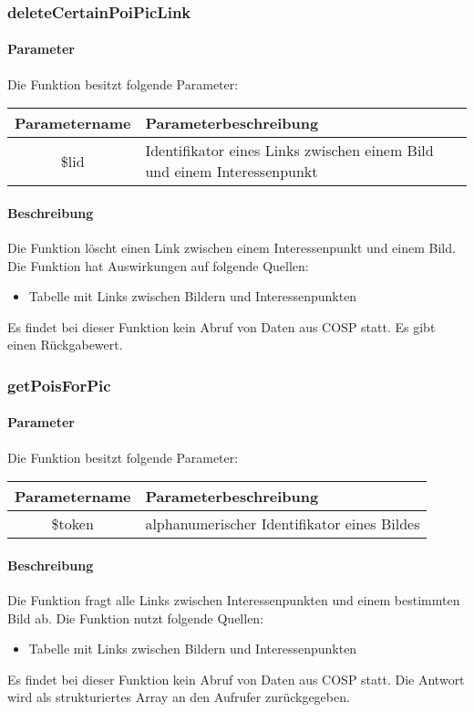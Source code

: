 \subsubsection{deleteCertainPoiPicLink}
\paragraph{Parameter} Die Funktion besitzt folgende Parameter:
\begin{table}[H]
	\begin{tabular}{|c|p{11cm}|}
		\hline
		\textbf{Parametername} & \textbf{Parameterbeschreibung} \\ \hline
		\$lid & Identifikator eines Links zwischen einem Bild und einem Interessenpunkt \\ \hline
	\end{tabular}
\end{table}
\paragraph{Beschreibung} Die Funktion löscht einen Link zwischen einem Interessenpunkt und einem Bild. Die Funktion hat Auswirkungen auf folgende Quellen:
\begin{itemize}
	\item Tabelle mit Links zwischen Bildern und Interessenpunkten
\end{itemize}
Es findet bei dieser Funktion kein Abruf von Daten aus {\glqq COSP\grqq} statt. Es gibt einen Rückgabewert.
\subsubsection{getPoisForPic}
\paragraph{Parameter} Die Funktion besitzt folgende Parameter:
\begin{table}[H]
	\begin{tabular}{|c|p{11cm}|}
		\hline
		\textbf{Parametername} & \textbf{Parameterbeschreibung} \\ \hline
		\$token & alphanumerischer Identifikator eines Bildes \\ \hline
	\end{tabular}
\end{table}
\paragraph{Beschreibung} Die Funktion fragt alle Links zwischen Interessenpunkten und einem bestimmten Bild ab. Die Funktion nutzt folgende Quellen:
\begin{itemize}
	\item Tabelle mit Links zwischen Bildern und Interessenpunkten
\end{itemize}
Es findet bei dieser Funktion kein Abruf von Daten aus {\glqq COSP\grqq} statt. Die Antwort wird als strukturiertes Array an den Aufrufer zurückgegeben.
